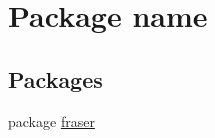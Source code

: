 \hypertarget{namespacename}{}\section{Package name}
\label{namespacename}
\subsection*{Packages}
\begin{DoxyCompactItemize}
\item 
package \hyperlink{namespacename_1_1fraser}{fraser}
\end{DoxyCompactItemize}
